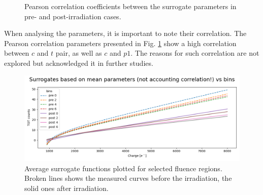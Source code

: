 \begin{figure}[H]
\begin{subfigure}[b]{0.45\textwidth}
  \end{subfigure}
  \caption[Corelation surrogate params]{Pearson correlation coefficients between the surrogate parameters in pre- and post-irradiation cases.}
    \label{plot:corr_matrix}
\end{figure}


When analysing the parameters, it is important to note their correlation.
The Pearson correlation parameters presented in Fig. \ref{plot:corr_matrix} show a high correlation between $c$ and $t$ pair, as well as $c$ and $p1$.
The reasons for such correlation are not explored but acknowledged it in further studies.

\begin{figure}[H]
\centering
\includegraphics[width=1.\textwidth]{figures/chapter4/surrogates/p2_bins_surrogates.png}
\caption{Average surrogate functions plotted for selected fluence regions. Broken lines shows the measured curves before the irradiation, the solid ones after irradiation.}
\label{fig:example_sur}
\end{figure}

